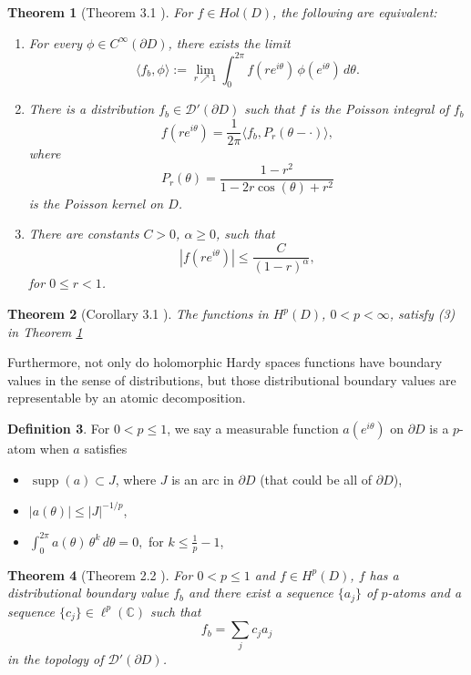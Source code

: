 \documentclass[suppldata]{interact}
\theoremstyle{plain}%
\newtheorem{theorem}{Theorem}[section]
\theoremstyle{definition}
\newtheorem{deff}[theorem]{Definition}
\theoremstyle{remark}
\newcommand{\C}{\mathbb C}
\DeclareMathOperator{\supp}{supp}
\newcommand{\p}{\partial}
\begin{document}
\begin{theorem}[Theorem 3.1 \cite{GHJH2}]\label{GHJH23point1}
For $f \in Hol(D)$, the following are equivalent:
\begin{enumerate}
    \item For every $\phi \in C^\infty(\p D)$, there exists the limit
    \[
             \langle f_b, \phi \rangle := \lim_{r \nearrow 1} \int_0^{2\pi} f(re^{i\theta}) \, \phi(e^{i\theta}) \,d\theta.
            \]

    \item There is a distribution $f_b \in \mathcal{D}'(\p D)$ such that $f$ is the Poisson integral of $f_b$
    \[
             f(re^{i\theta}) = \frac{1}{2\pi}\langle f_b, P_r(\theta - \cdot) \rangle,
            \]
    where 
    \[
        P_r(\theta) = \frac{1-r^2}{1-2r\cos(\theta) +r^2}
    \]
    is the Poisson kernel on $D$. 

    \item There are constants $C>0$, $\alpha \geq 0$, such that 
    \[
        |f(re^{i\theta})| \leq \frac{C}{(1-r)^\alpha},
    \]
    for $0 \leq r < 1$.
\end{enumerate}
\end{theorem}


\begin{theorem}[Corollary 3.1 \cite{GHJH2}]\label{GHJH23point1corr}
The functions in $H^p(D)$, $0 < p < \infty$, satisfy (3) in Theorem \ref{GHJH23point1}
\end{theorem}

Furthermore, not only do holomorphic Hardy spaces functions have boundary values in the sense of distributions, but those distributional boundary values are representable by an atomic decomposition. 

\begin{deff}
    For $0 < p \leq 1$, we say a measurable function $a(e^{i\theta})$ on $\p D$ is a $p$-atom when $a$ satisfies
    \begin{itemize}
    \item $\supp(a) \subset J$, where $J$ is an arc in $\p D$ (that could be all of $\p D$),
    \item $|a(\theta)|\leq |J|^{-1/p}$,
    \item $\int_0^{2\pi} a(\theta) \, \theta^k \,d\theta = 0,$ for $k \leq \frac{1}{p} -1$,
\end{itemize}
\end{deff}

\begin{theorem}[Theorem 2.2 \cite{GHJH2}]\label{GHJH2twopointtwo}
    For $0 < p \leq 1$ and $f \in H^p(D)$, $f$ has a distributional boundary value $f_b$ and there exist a sequence $\{a_j\}$ of $p$-atoms and a sequence $\{c_j\} \in \ell^p(\C)$ such that 
    \[
        f_b = \sum_{j} c_j a_j
    \]
    in the topology of $\mathcal{D}'(\p D)$. 
\end{theorem}
\end{document}
